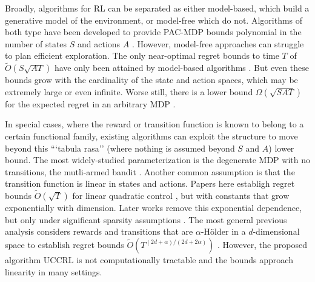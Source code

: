\documentclass{article}
\begin{document}

Broadly, algorithms for RL can be separated as either model-based, which build a generative model of the environment, or model-free which do not.
Algorithms of both type have been developed to provide PAC-MDP bounds polynomial in the number of states $S$ and actions $A$ \cite{kearns2002near,brafman2003r,strehl2006pac}.
However, model-free approaches can struggle to plan efficient exploration.
The only near-optimal regret bounds to time $T$ of $\tilde{O}(S\sqrt{AT})$ have only been attained by model-based algorithms \cite{jaksch2010near,osband2013more}.
But even these bounds grow with the cardinality of the state and action spaces, which may be extremely large or even infinite.
Worse still, there is a lower bound $\Omega ( \sqrt{SAT} )$ for the expected regret in an arbitrary MDP \cite{jaksch2010near}.

In special cases, where the reward or transition function is known to belong to a certain functional family, existing algorithms can exploit the structure to move beyond this ```tabula rasa'' (where nothing is assumed beyond $S$ and $A$) lower bound.
The most widely-studied parameterization is the degenerate MDP with no transitions, the mutli-armed bandit \cite{auer2003using,bubeck2011xarmed,russo2013}.
Another common assumption is that the transition function is linear in states and actions.
Papers here establigh regret bounds $\tilde{O}(\sqrt{T})$ for linear quadratic control \cite{abbasi2011improved}, but with constants that grow exponentially with dimension.
Later works remove this exponential dependence, but only under significant sparsity assumptions \cite{ibrahimi2012efficient}.
The most general previous analysis considers rewards and transitions that are $\alpha$-H\"{o}lder in a $d$-dimensional space to establish regret bounds $\tilde{O}(T^{(2d+\alpha)/(2d+2\alpha)})$ \cite{ortner2012online}.
However, the proposed algorithm UCCRL is not computationally tractable and the bounds approach linearity in many settings.
\end{document}
